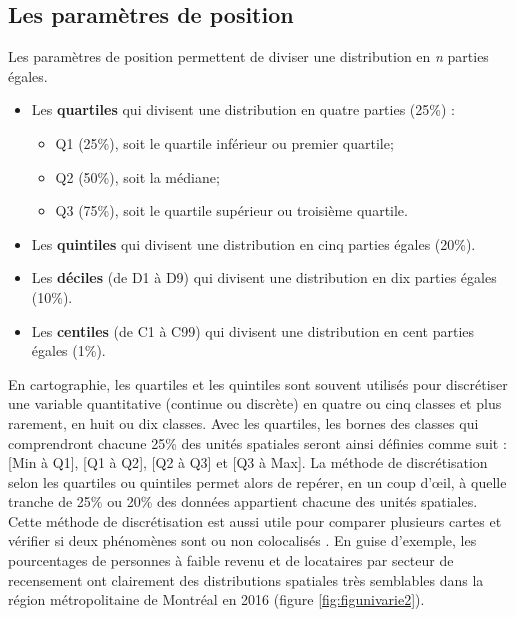 \documentclass[
  11pt,
  french,
]{book}
\providecommand{\tightlist}{%
  \setlength{\itemsep}{0pt}\setlength{\parskip}{0pt}}
\begin{document}
\hypertarget{sect0252}{%
\subsection{Les paramètres de position}\label{sect0252}}

Les paramètres de position permettent de diviser une distribution en \emph{n} parties égales.

\begin{itemize}
\tightlist
\item
  Les \textbf{quartiles} qui divisent une distribution en quatre parties (25\%) :

  \begin{itemize}
  \tightlist
  \item
    Q1 (25\%), soit le quartile inférieur ou premier quartile;
  \item
    Q2 (50\%), soit la médiane;
  \item
    Q3 (75\%), soit le quartile supérieur ou troisième quartile.
  \end{itemize}
\item
  Les \textbf{quintiles} qui divisent une distribution en cinq parties égales (20\%).
\item
  Les \textbf{déciles} (de D1 à D9) qui divisent une distribution en dix parties égales (10\%).
\item
  Les \textbf{centiles} (de C1 à C99) qui divisent une distribution en cent parties égales (1\%).
\end{itemize}

En cartographie, les quartiles et les quintiles sont souvent utilisés pour discrétiser une variable quantitative (continue ou discrète) en quatre ou cinq classes et plus rarement, en huit ou dix classes. Avec les quartiles, les bornes des classes qui comprendront chacune 25\% des unités spatiales seront ainsi définies comme suit : {[}Min à Q1{]}, {[}Q1 à Q2{]}, {[}Q2 à Q3{]} et {[}Q3 à Max{]}. La méthode de discrétisation selon les quartiles ou quintiles permet alors de repérer, en un coup d'œil, à quelle tranche de 25\% ou 20\% des données appartient chacune des unités spatiales. Cette méthode de discrétisation est aussi utile pour comparer plusieurs cartes et vérifier si deux phénomènes sont ou non colocalisés \citep{pumain1994}. En guise d'exemple, les pourcentages de personnes à faible revenu et de locataires par secteur de recensement ont clairement des distributions spatiales très semblables dans la région métropolitaine de Montréal en 2016 (figure \ref{fig:figunivarie2}).
\end{document}
